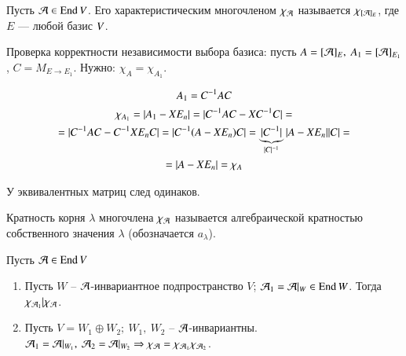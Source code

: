 \documentclass[main]{subfiles}
\begin{document}
\begin{definition}
    Пусть $\mathcal{A} \in \operatorname{End} V$. Его характеристическим многочленом $\chi_{\mathcal{A}}$ называется
    $\chi_{[\mathcal{A}]_E}$, где $E$  — любой базис $V$.
\end{definition}

Проверка корректности независимости выбора базиса: пусть $A = [\mathcal{A}]_E,\ A_1 = [\mathcal{A}]_{E_1}$,
$C = M_{E \rightarrow E_1}$. Нужно: $\chi_{A} = \chi_{A_1}$.

\[A_1 = C^{-1}A C\]
\begin{multline*}
    \chi_{A_1} = |A_1 - X E_n| =
    |C^{-1}A C - XC^{-1}C| = \\ = |C^{-1}A C - C^{-1}XE_nC| =
    |C^{-1}(A - XE_n) C| = \underbrace{|C^{-1}|}_{|C|^{-1}}|A - XE_n||C| = \\ =
    |A - XE_n| = \chi_{A}
\end{multline*}

У эквивалентных матриц след одинаков.


\begin{definition} 
    Кратность корня $\lambda$ многочлена $\chi_{\mathcal{A}}$ называется алгебраической кратностью собственного значения $\lambda$ (обозначается $a_{\lambda}$).
\end{definition}

\begin{proposition}
    Пусть $\mathcal{A} \in \operatorname{End} V$
    \begin{enumerate}
        \item Пусть $W$ -- ${\mathcal{A}}$-инвариантное подпространство $V$; $\mathcal{A}_1 = \mathcal{A}|_W \in \operatorname{End} W$. Тогда $\chi_{\mathcal{A}_1} | \chi_{\mathcal{A}}$.
        \item Пусть $V = W_1 \oplus W_2;\ W_1,\ W_2$ -- $\mathcal{A}$-инвариантны. $\mathcal{A}_1 = \mathcal{A}|_{W_1},\ \mathcal{A}_2 = \mathcal{A}|_{W_2} \Rightarrow
                  \chi_{\mathcal{A}} = \chi_{\mathcal{A}_1}\chi_{\mathcal{A}_2}$.
    \end{enumerate}

\end{proposition}
\end{document}
